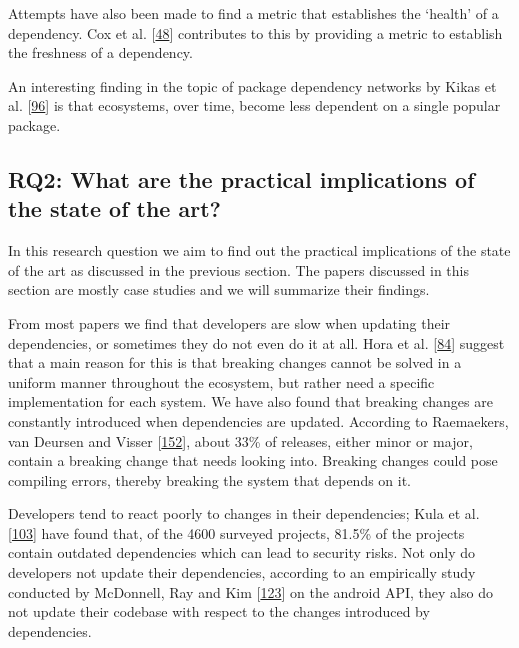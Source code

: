 \documentclass[]{book}
\begin{document}
Attempts have also been made to find a metric that establishes the
`health' of a dependency. Cox et al.
{[}\protect\hyperlink{ref-Cox2015}{48}{]} contributes to this by
providing a metric to establish the freshness of a dependency.

An interesting finding in the topic of package dependency networks by
Kikas et al. {[}\protect\hyperlink{ref-Kikas2017}{96}{]} is that
ecosystems, over time, become less dependent on a single popular
package.

\subsection{RQ2: What are the practical implications of the state of the
art?}\label{rq2-what-are-the-practical-implications-of-the-state-of-the-art}

In this research question we aim to find out the practical implications
of the state of the art as discussed in the previous section. The papers
discussed in this section are mostly case studies and we will summarize
their findings.

From most papers we find that developers are slow when updating their
dependencies, or sometimes they do not even do it at all. Hora et al.
{[}\protect\hyperlink{ref-Hora2016}{84}{]} suggest that a main reason
for this is that breaking changes cannot be solved in a uniform manner
throughout the ecosystem, but rather need a specific implementation for
each system. We have also found that breaking changes are constantly
introduced when dependencies are updated. According to Raemaekers, van
Deursen and Visser {[}\protect\hyperlink{ref-Raemaekers2017}{152}{]},
about 33\% of releases, either minor or major, contain a breaking change
that needs looking into. Breaking changes could pose compiling errors,
thereby breaking the system that depends on it.

Developers tend to react poorly to changes in their dependencies; Kula
et al. {[}\protect\hyperlink{ref-Kula2017}{103}{]} have found that, of
the 4600 surveyed projects, 81.5\% of the projects contain outdated
dependencies which can lead to security risks. Not only do developers
not update their dependencies, according to an empirically study
conducted by McDonnell, Ray and Kim
{[}\protect\hyperlink{ref-McDonnell2013}{123}{]} on the android API,
they also do not update their codebase with respect to the changes
introduced by dependencies.
\end{document}
